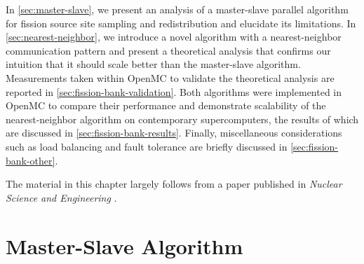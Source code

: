 In \autoref{sec:master-slave}, we present an analysis of a master-slave parallel
algorithm for fission source site sampling and redistribution and elucidate its
limitations. In \autoref{sec:nearest-neighbor}, we introduce a novel algorithm
with a nearest-neighbor communication pattern and present a theoretical analysis
that confirms our intuition that it should scale better than the master-slave
algorithm. Measurements taken within OpenMC to validate the theoretical analysis
are reported in \autoref{sec:fission-bank-validation}. Both algorithms were
implemented in OpenMC to compare their performance and demonstrate scalability
of the nearest-neighbor algorithm on contemporary supercomputers, the results of
which are discussed in \autoref{sec:fission-bank-results}. Finally,
miscellaneous considerations such as load balancing and fault tolerance are
briefly discussed in \autoref{sec:fission-bank-other}.

The material in this chapter largely follows from a paper published in
\emph{Nuclear Science and Engineering} \cite{nse-romano-2012}.

\section{Master-Slave Algorithm}
\label{sec:master-slave}

